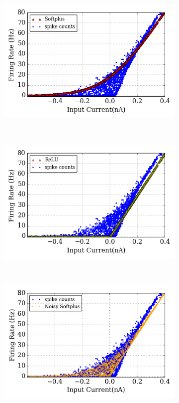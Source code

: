 \documentclass[runningheads,a4paper]{llncs}
\begin{document}
\begin{figure}[tbh!]
	\centering
	\begin{subfigure}[t]{0.6\textwidth}
		\includegraphics[width=\textwidth]{6-5-1.png}
	\end{subfigure}\\
	\begin{subfigure}[t]{0.6\textwidth}
		\includegraphics[width=\textwidth]{6-5-2.png}
	\end{subfigure}\\
	\begin{subfigure}[t]{0.6\textwidth}
		\includegraphics[width=\textwidth]{6-5-3.pdf}

\end{subfigure}
\end{figure}
\end{document}
